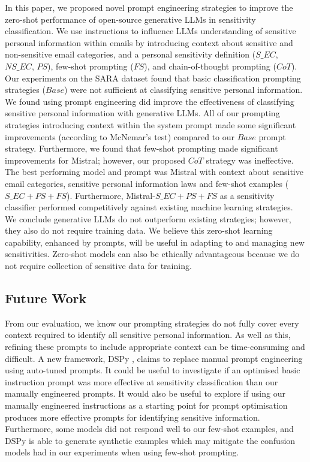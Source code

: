 In this paper, we proposed novel prompt engineering strategies to improve the zero-shot performance of open-source generative LLMs in sensitivity classification. We use instructions to influence LLMs understanding of sensitive personal information within emails by introducing context about sensitive and non-sensitive email categories, and a personal sensitivity definition ($S\_EC$, $NS\_EC$, $PS$), few-shot prompting ($FS$), and chain-of-thought prompting ($CoT$). Our experiments on the SARA dataset found that basic classification prompting strategies ($Base$) were not sufficient at classifying sensitive personal information. We found using prompt engineering did improve the effectiveness of classifying sensitive personal information with generative LLMs. All of our prompting strategies introducing context within the system prompt made some significant improvements (according to McNemar’s test) compared to our $Base$ prompt strategy. Furthermore, we found that few-shot prompting made significant improvements for Mistral; however, our proposed $CoT$ strategy was ineffective. The best performing model and prompt was Mistral with context about sensitive email categories, sensitive personal information laws and few-shot examples ($S\_EC+PS+FS$). Furthermore, Mistral-$S\_EC+PS+FS$ as a sensitivity classifier performed competitively against existing machine learning strategies. We conclude generative LLMs do not outperform existing strategies; however, they also do not require training data. We believe this zero-shot learning capability, enhanced by prompts, will be useful in adapting to and managing new sensitivities. Zero-shot models can also be ethically advantageous because we do not require collection of sensitive data for training.

\subsection{Future Work}
From our evaluation, we know our prompting strategies do not fully cover every context required to identify all sensitive personal information. As well as this, refining these prompts to include appropriate context can be time-consuming and difficult. A new framework, DSPy \cite{khattab2023dspy}, claims to replace manual prompt engineering using auto-tuned prompts. It could be useful to investigate if an optimised basic instruction prompt was more effective at sensitivity classification than our manually engineered prompts. It would also be useful to explore if using our manually engineered instructions as a starting point for prompt optimisation produces more effective prompts for identifying sensitive information. Furthermore, some models did not respond well to our few-shot examples, and DSPy is able to generate synthetic examples which may mitigate the confusion models had in our experiments when using few-shot prompting.

